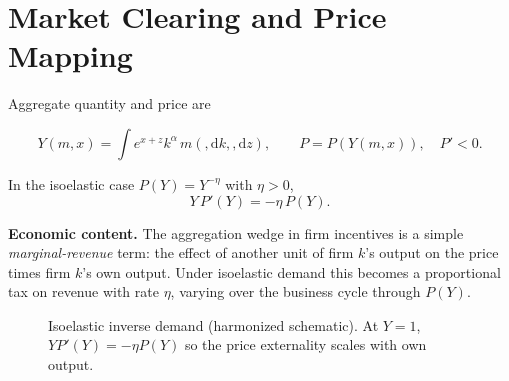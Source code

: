 \documentclass[11pt,letterpaper,oneside]{article}
\numberwithin{equation}{section}
\newcommand{\1}{\mathbf{1}}
\newcommand{\diff}{,\mathrm{d}}
\begin{document}
\section{Market Clearing and Price Mapping}
Aggregate quantity and price are

$$
Y(m,x)=\int e^{x+z}k^\alpha\,m(\diff k,\diff z),\qquad P=P(Y(m,x)),\quad P'<0.
$$

In the isoelastic case $P(Y)=Y^{-\eta}$ with $\eta>0$,
\begin{equation}\label{eq:isoelastic}
Y\,P'(Y) = -\eta\, P(Y).
\end{equation}

\begin{tcolorbox}[didacticstyle]
\textbf{Economic content.} The aggregation wedge in firm incentives is a simple \emph{marginal-revenue} term: the effect of another unit of firm $k$'s output on the price times firm $k$'s own output. Under isoelastic demand this becomes a proportional tax on revenue with rate $\eta$, varying over the business cycle through $P(Y)$.
\end{tcolorbox}

\begin{figure}[ht]
\centering
\caption{Isoelastic inverse demand (harmonized schematic). At $Y=1$, $Y P'(Y)=-\eta P(Y)$ so the price externality scales with own output.}
\label{fig:isoelastic_demand}
\end{figure}
\end{document}
